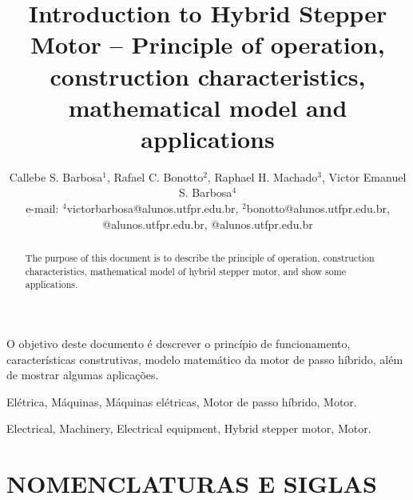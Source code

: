 
\title{Introduction to Hybrid Stepper Motor -- Principle of operation, construction characteristics, mathematical model and applications}

\author{Callebe S. Barbosa$^{1}$, Rafael C. Bonotto$^{2}$, Raphael H. Machado$^{3}$, Victor Emanuel S. Barbosa$^{4}$\\
	\normalsize e-mail: $^{4}$victorbarbosa@alunos.utfpr.edu.br, $^{2}$bonotto@alunos.utfpr.edu.br, @alunos.utfpr.edu.br, @alunos.utfpr.edu.br
}



\maketitle

\begin{resumo}
	O objetivo deste documento é descrever o princípio de funcionamento, características construtivas, modelo matemático da motor de passo híbrido, além de mostrar algumas aplicações.
\end{resumo}

\begin{palavraschave}
	Elétrica, Máquinas, Máquinas elétricas, Motor de passo híbrido, Motor.
\end{palavraschave}

\englishtitle

\begin{abstract}
	The purpose of this document is to describe the principle of operation, construction characteristics, mathematical model of hybrid stepper motor, and show some applications.
\end{abstract}

\begin{keywords}
	Electrical, Machinery, Electrical equipment, Hybrid stepper motor, Motor.
\end{keywords}

\section*{NOMENCLATURAS E SIGLAS}

